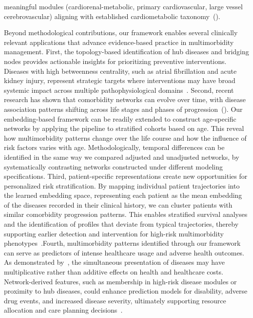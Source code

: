 meaningful modules (cardiorenal-metabolic, primary cardiovascular, large vessel cerebrovascular) aligning with established cardiometabolic taxonomy~(\cite{Chiadi2023, WHO_CVDs_2025}).

Beyond methodological contributions, our framework enables several clinically relevant applications that advance evidence-based practice in multimorbidity management. First, the topology-based identification of hub diseases and bridging nodes provides actionable insights for prioritizing preventive interventions. Diseases with high betweenness centrality, such as atrial fibrillation and acute kidney injury, represent strategic targets where interventions may have broad systemic impact across multiple pathophysiological domains~\cite{Zhao2023ComorbidityNetwork}. Second, recent research has shown that comorbidity networks can evolve over time, with disease association patterns shifting across life stages and phases of progression~(\citealp{dervic2025comorbidity, gardinazzi2025characterization}). Our embedding-based framework can be readily extended to construct age-specific networks by applying the pipeline to stratified cohorts based on age. This reveal how multimorbidity patterns change over the life course and how the influence of risk factors varies with age. Methodologically, temporal differences can be identified in the same way we compared adjusted and unadjusted networks, by systematically contrasting networks constructed under different modeling specifications. Third, patient-specific representations create new opportunities for personalized risk stratification. By mapping individual patient trajectories into the learned embedding space, representing each patient as the mean embedding of the diseases recorded in their clinical history, we can cluster patients with similar comorbidity progression patterns. This enables stratified survival analyses and the identification of profiles that deviate from typical trajectories, thereby supporting earlier detection and intervention for high-risk multimorbidity phenotypes~\cite{liang2024comorbidity}.Fourth, multimorbidity patterns identified through our framework can serve as predictors of intense healthcare usage and adverse health outcomes. As demonstrated by~\cite{Wolff2002}, the simultaneous presentation of diseases may have multiplicative rather than additive effects on health and healthcare costs. Network-derived features, such as membership in high-risk disease modules or proximity to hub diseases, could enhance prediction models for disability, adverse drug events, and increased disease severity, ultimately supporting resource allocation and care planning decisions~\cite{buja2025healthcare}.

